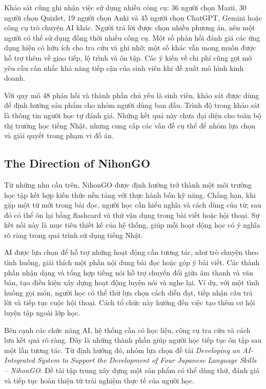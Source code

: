 Khảo sát cũng ghi nhận việc sử dụng nhiều công cụ: 36 người chọn Mazii, 30 người chọn Quizlet, 19 người chọn Anki và 45 người chọn ChatGPT, Gemini hoặc công cụ trò chuyện AI khác. Người trả lời được chọn nhiều phương án, nên một người có thể sử dụng đồng thời nhiều công cụ. Một số phản hồi đánh giá các ứng dụng hiện có hữu ích cho tra cứu và ghi nhớ; một số khác vẫn mong muốn được hỗ trợ thêm về giao tiếp, lộ trình và ôn tập. Các ý kiến về chi phí cũng gợi mở yêu cầu cân nhắc khả năng tiếp cận của sinh viên khi đề xuất mô hình kinh doanh.

Với quy mô 48 phản hồi và thành phần chủ yếu là sinh viên, khảo sát được dùng để định hướng sản phẩm cho nhóm người dùng ban đầu. Trình độ trong khảo sát là thông tin người học tự đánh giá. Những kết quả này chưa đại diện cho toàn bộ thị trường học tiếng Nhật, nhưng cung cấp các vấn đề cụ thể để nhóm lựa chọn và giải quyết trong phạm vi đồ án.

\subsection{The Direction of NihonGO}

Từ những nhu cầu trên, NihonGO được định hướng trở thành một môi trường học tập kết hợp kiến thức nền tảng với thực hành bốn kỹ năng. Chẳng hạn, khi gặp một từ mới trong bài đọc, người học cần hiểu nghĩa và cách dùng của từ; sau đó có thể ôn lại bằng flashcard và thử vận dụng trong bài viết hoặc hội thoại. Sự kết nối này là mục tiêu thiết kế của hệ thống, giúp mỗi hoạt động học có ý nghĩa rõ ràng trong quá trình sử dụng tiếng Nhật.

AI được lựa chọn để hỗ trợ những hoạt động cần tương tác, như trò chuyện theo tình huống, giải thích một phần nội dung bài đọc hoặc góp ý bài viết. Các thành phần nhận dạng và tổng hợp tiếng nói hỗ trợ chuyển đổi giữa âm thanh và văn bản, tạo điều kiện xây dựng hoạt động luyện nói và nghe lại. Ví dụ, với một tình huống gọi món, người học có thể thử lựa chọn cách diễn đạt, tiếp nhận câu trả lời và tiếp tục cuộc hội thoại. Cách tổ chức này hướng đến việc tạo thêm cơ hội luyện tập ngoài lớp học.

Bên cạnh các chức năng AI, hệ thống cần có học liệu, công cụ tra cứu và cách lưu kết quả rõ ràng. Đây là những thành phần giúp người học tiếp tục ôn tập sau một lần tương tác. Từ định hướng đó, nhóm lựa chọn đề tài \textit{Developing an AI-Integrated System to Support the Development of Four Japanese Language Skills -- NihonGO}. Đề tài tập trung xây dựng một sản phẩm có thể dùng thử, đánh giá và tiếp tục hoàn thiện từ trải nghiệm thực tế của người học.

